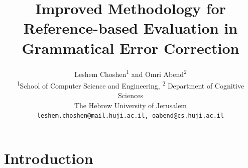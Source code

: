 \documentclass[english]{article}
\begin{document}
	
\title{Improved Methodology for Reference-based Evaluation in \\ Grammatical Error Correction}

\author{
  Leshem Choshen\textsuperscript{1} and Omri Abend\textsuperscript{2} \\
  \textsuperscript{1}School of Computer Science and Engineering,
  \textsuperscript{2} Department of Cognitive Sciences \\
  The Hebrew University of Jerusalem \\
  \texttt{leshem.choshen@mail.huji.ac.il, oabend@cs.huji.ac.il}\\
}


\maketitle

\begin{abstract}
	
\end{abstract}

\section{Introduction}



\end{document}
